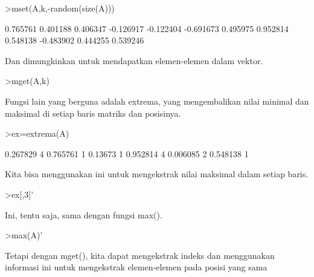 \documentclass[a4paper,10pt]{article}
\begin{document}
\begin{eulernotebook}
\begin{eulerprompt}
>mset(A,k,-random(size(A)))
\end{eulerprompt}
\begin{euleroutput}
       0.765761      0.401188      0.406347     -0.126917 
      -0.122404     -0.691673      0.495975      0.952814 
       0.548138     -0.483902      0.444255      0.539246 
\end{euleroutput}
\begin{eulercomment}
Dan dimungkinkan untuk mendapatkan elemen-elemen dalam vektor.
\end{eulercomment}
\begin{eulerprompt}
>mget(A,k)
\end{eulerprompt}
\begin{euleroutput}
  [0.267829,  0.13673,  0.390567,  0.006085]
\end{euleroutput}
\begin{eulercomment}
Fungsi lain yang berguna adalah extrema, yang mengembalikan nilai
minimal dan maksimal di setiap baris matriks dan posisinya.
\end{eulercomment}
\begin{eulerprompt}
>ex=extrema(A)
\end{eulerprompt}
\begin{euleroutput}
       0.267829             4      0.765761             1 
        0.13673             1      0.952814             4 
       0.006085             2      0.548138             1 
\end{euleroutput}
\begin{eulercomment}
Kita bisa menggunakan ini untuk mengekstrak nilai maksimal dalam
setiap baris.
\end{eulercomment}
\begin{eulerprompt}
>ex[,3]'
\end{eulerprompt}
\begin{euleroutput}
  [0.765761,  0.952814,  0.548138]
\end{euleroutput}
\begin{eulercomment}
Ini, tentu saja, sama dengan fungsi max().
\end{eulercomment}
\begin{eulerprompt}
>max(A)'
\end{eulerprompt}
\begin{euleroutput}
  [0.765761,  0.952814,  0.548138]
\end{euleroutput}
\begin{eulercomment}
Tetapi dengan mget(), kita dapat mengekstrak indeks dan menggunakan
informasi ini untuk mengekstrak elemen-elemen pada posisi yang sama

\end{eulercomment}
\end{eulernotebook}
\end{document}

